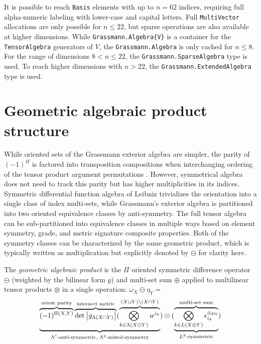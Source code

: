 \documentclass{juliacon}
\begin{document}
It is possible to reach \verb`Basis` elements with up to $n=62$ indices, %
requiring full alpha-numeric labeling with lower-case and capital letters. 
Full \verb`MultiVector` allocations are only possible for $n\leq22$, but sparse operations are also available at higher dimensions.
While \verb`Grassmann.Algebra{V}` is a container for the \verb`TensorAlgebra` generators of $V$, the \verb`Grassmann.Algebra` is only cached for $n\leq8$.
For the range of dimensions $8<n\leq22$, the \verb`Grassmann.SparseAlgebra` type is used.
To reach higher dimensions with $n>22$, the \verb`Grassmann.ExtendedAlgebra` type is used.

\section{Geometric algebraic product structure}

While oriented sets of the Grassmann exterior algebra are simpler, the parity of $(-1)^\Pi$ is factored into transposition compositions when interchanging ordering of the tensor product argument permutations \cite{artin}.
However, symmetrical algebra does not need to track this parity but has higher multiplicities in its indices.
Symmetric differential function algebra of Leibniz trivializes the orientation into a single class of index multi-sets, while Grassmann's exterior algebra is partitioned into two oriented equivalence classes by anti-symmetry.
The full tensor algebra can be sub-partitioned into equivalence classes in multiple ways based on element symmetry, grade, and metric signature composite properties.
Both of the symmetry classes can be characterized by the same geometric product, which is typically written as multiplication but explicitly denoted by $\ominus$ for clarity here.

\begin{definition}
	The \textit{geometric algebraic product} is the $\Pi$ oriented symmetric difference operator $\ominus$ (weighted by the bilinear form $g$) and multi-set sum $\oplus$ applied to multilinear tensor products $\otimes$ in a single operation:
	$ \omega_X\ominus \eta_Y = $
	$$\ub{\text{$\Lambda^1$-anti-symmetric, $\Lambda^g$-mixed-symmetry}}{\ob{\text{orient parity}}{(-1)^{\Pi(X,Y)}}\ob{\text{intersect metric}}{\det\mat{g_{\Lambda(X\cap Y)}}} (\ob{(X\cup Y)\bs(X\cap Y)}{\bigotimes_{k\in \Lambda(X\ominus Y)} w^{i_k}}})\otimes (\ub{\text{$L^g$-symmetric}}{\ob{\text{multi-set sum}}{\bigotimes_{k\in L(X\oplus Y)} \epsilon_{i_k}^{\otimes\mu_k}}})$$
\end{definition}
\end{document}
